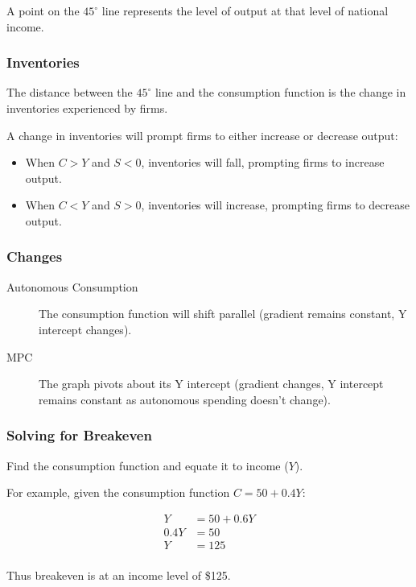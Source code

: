 \documentclass[a4paper,11pt]{article}
\begin{document}
A point on the $45^\circ$ line represents the level of output at that level of
national income.


\subsubsection{Inventories}

The distance between the $45^\circ$ line and the consumption function is the
change in inventories experienced by firms.

A change in inventories will prompt firms to either increase or decrease
output:

\begin{itemize}
\item When $C > Y$ and $S < 0$, inventories will fall, prompting firms to
	increase output.
\item When $C < Y$ and $S > 0$, inventories will increase, prompting firms to
	decrease output.
\end{itemize}


\subsubsection{Changes}

\begin{description}
\item [Autonomous Consumption] The consumption function will shift parallel
	(gradient remains constant, Y intercept changes).
\item [MPC] The graph pivots about its Y intercept (gradient changes, Y
	intercept remains constant as autonomous spending doesn't change).
\end{description}


\subsubsection{Solving for Breakeven}

Find the consumption function and equate it to income ($Y$).

For example, given the consumption function $C = 50 + 0.4Y$:

$$
\begin{aligned}
Y & = 50 + 0.6Y \\
0.4Y & = 50 \\
Y & = 125 \\
\end{aligned}
$$

Thus breakeven is at an income level of \$125.
\end{document}
